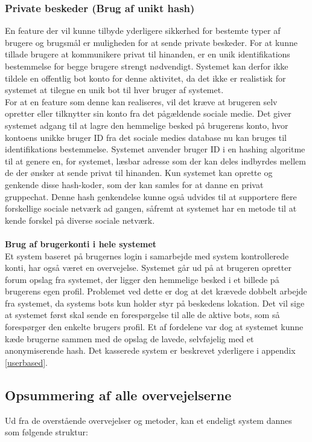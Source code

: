 \subsubsection{Private beskeder (Brug af unikt hash)}
En feature der vil kunne tilbyde yderligere sikkerhed for bestemte typer af brugere og brugsmål er muligheden for at sende private beskeder. For at kunne tillade brugere at kommunikere privat til hinanden, er en unik identifikations bestemmelse for begge brugere strengt nødvendigt. Systemet kan derfor ikke tildele en offentlig bot konto for denne aktivitet, da det ikke er realistisk for systemet at tilegne en unik bot til hver bruger af systemet.\\
For at en feature som denne kan realiseres, vil det kræve at brugeren selv opretter eller tilknytter sin konto fra det pågældende sociale medie. Det giver systemet adgang til at lagre den hemmelige besked på brugerens konto, hvor kontoens unikke bruger ID fra det sociale medies database nu kan bruges til identifikations bestemmelse. Systemet anvender bruger ID i en hashing algoritme til at genere en, for systemet, læsbar adresse som der kan deles indbyrdes mellem de der ønsker at sende privat til hinanden. Kun systemet kan oprette og genkende disse hash-koder, som der kan samles for at danne en privat gruppechat. Denne hash genkendelse kunne også udvides til at supportere flere forskellige sociale netværk ad gangen, såfremt at systemet har en metode til at kende forskel på diverse sociale netværk.
\\\\
\textbf{Brug af brugerkonti i hele systemet}\\
Et system baseret på brugernes login i samarbejde med system kontrollerede konti, har også været en overvejelse. Systemet går ud på at brugeren opretter forum opslag fra systemet, der ligger den hemmelige besked i et billede på brugerens egen profil. Problemet ved dette er dog at det krævede dobbelt arbejde fra systemet, da systems bots kun holder styr på beskedens lokation. Det vil sige at systemet først skal sende en forespørgelse til alle de aktive bots, som så forespørger den enkelte brugers profil. Et af fordelene var dog at systemet kunne kæde brugerne sammen med de opslag de lavede, selvføjelig med et anonymiserende hash. Det kasserede system er beskrevet yderligere i appendix \ref{userbased}.

\subsection{Opsummering af alle overvejelserne}
\label{Opsummering_Overvejelserne}
Ud fra de overstående overvejelser og metoder, kan et endeligt system dannes som følgende struktur:

